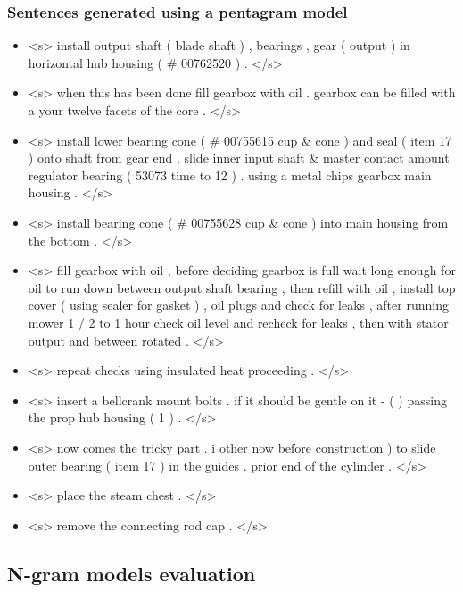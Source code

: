 \subsubsection{Sentences generated using a pentagram model}\label{subsec:pentagram-sentences}

\begin{itemize}
	\item <s> install output shaft ( blade shaft ) , bearings , gear ( output ) in horizontal hub housing ( \# 00762520 ) . </s>
	\item <s> when this has been done fill gearbox with oil . gearbox can be filled with a your twelve facets of the core . </s>
	\item <s> install lower bearing cone ( \# 00755615 cup \& cone ) and seal ( item 17 ) onto shaft from gear end . slide inner input shaft \& master contact amount regulator bearing ( 53073 time to 12 ) . using a metal chips gearbox main housing . </s>
	\item <s> install bearing cone ( \# 00755628 cup \& cone ) into main housing from the bottom . </s>
	\item <s> fill gearbox with oil , before deciding gearbox is full wait long enough for oil to run down between output shaft bearing , then refill with oil , install top cover ( using sealer for gasket ) , oil plugs and check for leaks , after running mower 1 / 2 to 1 hour check oil level and recheck for leaks , then with stator output and between rotated . </s>
	\item <s> repeat checks using insulated heat proceeding . </s>
	\item <s> insert a bellcrank mount bolts . if it should be gentle on it - ( ) passing the prop hub housing ( 1 ) . </s>
	\item <s> now comes the tricky part . i other now before construction ) to slide outer bearing ( item 17 ) in the guides . prior end of the cylinder . </s>
	\item <s> place the steam chest . </s>
	\item <s> remove the connecting rod cap . </s>
\end{itemize}



\subsection{N-gram models evaluation}

